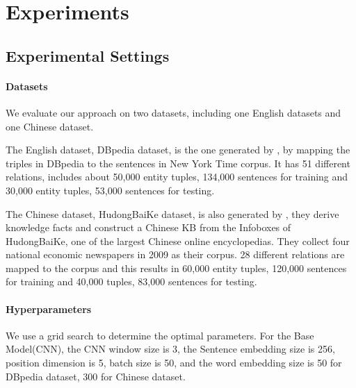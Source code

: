 \section{Experiments}

\subsection{Experimental Settings}
\paragraph{Datasets}
We evaluate our approach on two datasets, including one English datasets and one Chinese dataset.

The English dataset, DBpedia dataset, is the one generated by \cite{chen2014encoding}, by mapping the triples in DBpedia \cite{bizer2009dbpedia} to the sentences in New York Time corpus. It has 51 different relations, includes about 50,000 entity tuples, 134,000 sentences for training and 30,000 entity tuples, 53,000 sentences for testing.

The Chinese dataset, HudongBaiKe dataset, is also generated by \cite{chen2014encoding}, they derive knowledge facts and construct a Chinese KB from the Infoboxes of HudongBaiKe, one of the largest Chinese online encyclopedias. They collect four national economic newspapers in 2009 as their corpus. 28 different relations are mapped to the corpus and this results in 60,000 entity tuples, 120,000 sentences for training and 40,000 tuples, 83,000 sentences for testing.

\paragraph{Hyperparameters}
We use a grid search to determine the optimal parameters. For the Base Model(CNN), the CNN window size is 3, the Sentence embedding size is 256, position dimension is 5, batch size is 50, and the word embedding size is 50 for DBpedia dataset, 300 for Chinese dataset.

